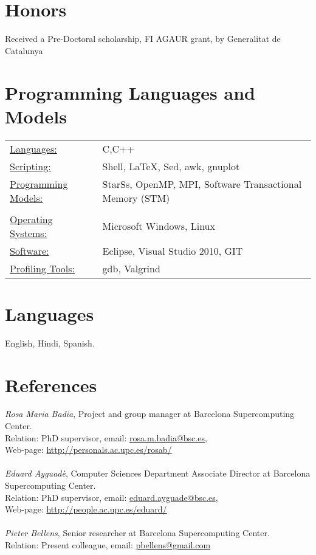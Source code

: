 \documentclass[margin]{res}
\begin{document}
\begin{resume}
\section{Honors} 
Received a Pre-Doctoral scholarship, FI AGAUR grant,  by Generalitat de Catalunya

\section{Programming Languages and Models}
   \begin{tabular}{l p{3in}}
    \underline{Languages:} & C\smallskip ,C++ \smallskip \\
	\underline{Scripting:} & Shell\smallskip, LaTeX\smallskip , Sed\smallskip, awk\smallskip, gnuplot\\
	\underline{Programming Models:} & StarSs\smallskip, OpenMP\smallskip , MPI\smallskip, Software Transactional Memory (STM)\\\\
	\underline{Operating Systems:}  & Microsoft Windows\smallskip , Linux\\
    \underline{Software:} & Eclipse, Visual Studio 2010\smallskip, GIT\smallskip\\
    \underline{Profiling Tools:} &gdb, Valgrind\smallskip \\ 
 \end{tabular}
%
\section{Languages}
English, Hindi, Spanish.
\section{References}
%
{\it Rosa Maria Badia}, Project and group manager at Barcelona Supercomputing Center.\\ 
Relation: PhD supervisor, email: \href{}{rosa.m.badia@bsc.es},\\
Web-page: \url{http://personals.ac.upc.es/rosab/}\\\\ 
%
{\it Eduard Ayguadè}, Computer Sciences Department Associate Director at Barcelona Supercomputing Center.\\ 
Relation: PhD supervisor, email: \href{}{eduard.ayguade@bsc.es},\\
Web-page: \url{http://people.ac.upc.es/eduard/}\\\\ 
%
{\it Pieter Bellens}, Senior researcher at Barcelona Supercomputing Center.\\
Relation: Present colleague, email: \href{}{pbellens@gmail.com} \\\\
%
\end{resume} 
%
\end{document}
